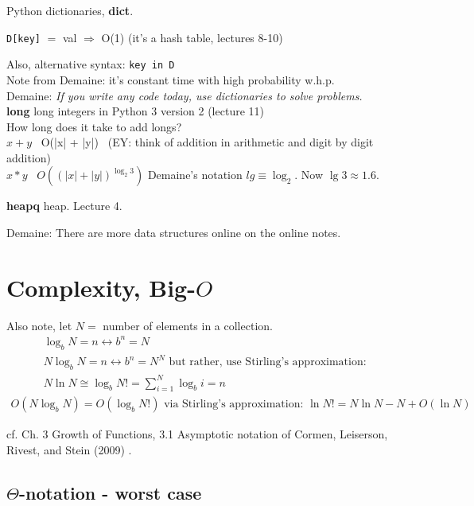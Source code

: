 \documentclass[10pt]{amsart}
\begin{document}
\begin{multicols*}{2}
Python dictionaries, \textbf{dict}.

\verb|D[key]| $=$ val $\Longrightarrow$ O(1) (it's a hash table, lectures 8-10)

Also, alternative syntax: \verb|key in D| \\

Note from Demaine: it's constant time with high probability w.h.p. \\

Demaine: \emph{If you write any code today, use dictionaries to solve problems.} \\

\textbf{long} long integers in Python 3 version 2 (lecture 11) \\

How long does it take to add longs? \\
$x+ y$ \quad \, O(|x| + |y|) \quad \, (EY: think of addition in arithmetic and digit by digit addition)  \\

$x * y$ \quad \, $O((|x| + |y|)^{\log_2{3}})$  Demaine's notation $lg \equiv \log_2$. Now $\lg{3} \approx 1.6$.

\textbf{heapq} heap. Lecture 4.

Demaine: There are more data structures online on the online notes.

\section{Complexity, Big-$O$}

Also note, let $N = $ number of elements in a collection.
\[
\begin{gathered}
	\log_b{N} = n \leftrightarrow b^n = N \\ 
 N \log_b{N} = n \leftrightarrow b^n = N^N \text{ but rather, use Stirling's approximation: } \\
 N \ln N \cong \log_b{N!} = \sum_{i=1}^N \log_b{i} = n  
\end{gathered}
\]
\[
\begin{gathered}
	O(N\log_b{N}) = O(\log_b{N!}) \text{ via Stirling's approximation: } \ln{N!} = N\ln{N} - N + O(\ln{N})
\end{gathered}
\]

cf. Ch. 3 Growth of Functions, 3.1 Asymptotic notation of Cormen, Leiserson, Rivest, and Stein (2009) \cite{CLRS2009}.

\subsection{$\Theta$-notation - worst case}



\end{multicols*}
\end{document}
